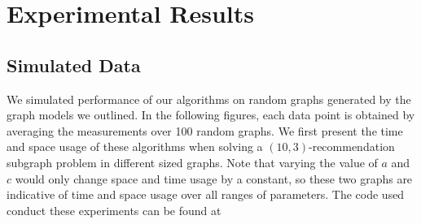 \section{Experimental Results}

\subsection{Simulated Data}
We simulated performance of our algorithms on random graphs generated
by the graph models we outlined. 
In the following figures, each data
point is obtained by averaging the measurements over 100 random
graphs. We first present the time and space usage of these algorithms when
solving a $(10,3)$-recommendation subgraph problem in different sized graphs.
Note that varying the value of $a$ and $c$ would only change space and time
usage by a constant, so these two graphs are indicative of time and space
usage over all ranges of parameters. The code used conduct these experiments 
can be found at %


